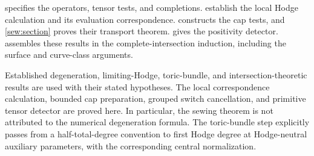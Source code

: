  specifies the operators, tensor tests, and completions.  establish the local Hodge calculation and its evaluation correspondence.  constructs the cap tests, and \cref{sew:section} proves their transport theorem.  gives the positivity detector.  assembles these results in the complete-intersection induction, including the surface and curve-class arguments.

Established degeneration, limiting-Hodge, toric-bundle, and intersection-theoretic results are used with their stated hypotheses. The local correspondence calculation, bounded cap preparation, grouped switch cancellation, and primitive tensor detector are proved here. In particular, the sewing theorem is not attributed to the numerical degeneration formula. The toric-bundle step explicitly passes from a half-total-degree convention to first Hodge degree at Hodge-neutral auxiliary parameters, with the corresponding central normalization.
